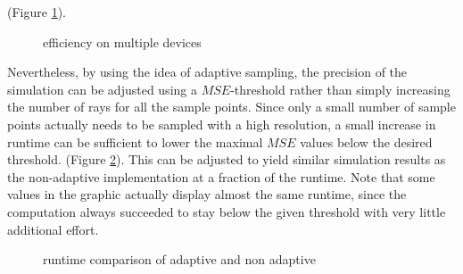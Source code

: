 (Figure \ref{plot:gpu_scaling}).
\begin{figure}[H]
  \centerline{
    }
  \caption{efficiency on multiple devices}
  \label{plot:gpu_scaling}
\end{figure}
Nevertheless, by using the idea of adaptive sampling, the precision of the
simulation can be adjusted using a $MSE$-threshold rather than simply increasing
the number of rays for all the sample points. Since only a small number of
sample points actually needs to be sampled with a high resolution, a small
increase in runtime can be sufficient to lower the maximal $MSE$ values below
the desired threshold. (Figure
\ref{plot:adaptive_runtime}). This can be adjusted to yield similar simulation
results as the non-adaptive implementation at a fraction of the runtime. Note
that some values in the graphic actually display almost the same runtime, since
the computation always succeeded to stay below the given threshold with very
little additional effort.
\begin{figure}[H]
  \centerline{
    }
  \caption{runtime comparison of adaptive and non adaptive }
  \label{plot:adaptive_runtime}
\end{figure}
